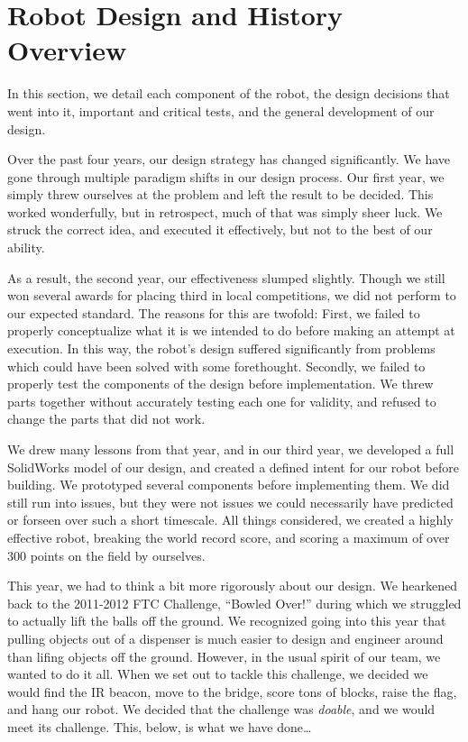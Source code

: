 \section{Robot Design and History Overview}
In this section, we detail each component of the robot, the design decisions that went into it, important and critical tests, and the general development of our design.

Over the past four years, our design strategy has changed significantly. We have gone through multiple paradigm shifts in our design process. Our first year, we simply threw ourselves at the problem and left the result to be decided. This worked wonderfully, but in retrospect, much of that was simply sheer luck. We struck the correct idea, and executed it effectively, but not to the best of our ability. 
	
As a result, the second year, our effectiveness slumped slightly. Though we still won several awards for placing third in local competitions, we did not perform to our expected standard. The reasons for this are twofold: First, we failed to properly conceptualize what it is we intended to do before making an attempt at execution. In this way, the robot's design suffered significantly from problems which could have been solved with some forethought. Secondly, we failed to properly test the components of the design before implementation. We threw parts together without accurately testing each one for validity, and refused to change the parts that did not work.

We drew many lessons from that year, and in our third year, we developed a full SolidWorks model of our design, and created a defined intent for our robot before building. We prototyped several components before implementing them. We did still run into issues, but they were not issues we could necessarily have predicted or forseen over such a short timescale. All things considered, we created a highly effective robot, breaking the world record score, and scoring a maximum of over 300 points on the field by ourselves.

This year, we had to think a bit more rigorously about our design. We hearkened back to the 2011-2012 FTC Challenge, ``Bowled Over!'' during which we struggled to actually lift the balls off the ground. We recognized going into this year that pulling objects out of a dispenser is much easier to design and engineer around than lifing objects off the ground. However, in the usual spirit of our team, we wanted to do it all. When we set out to tackle this challenge, we decided we would find the IR beacon, move to the bridge, score tons of blocks, raise the flag, and hang our robot. We decided that the challenge was \textit{doable}, and we would meet its challenge. This, below, is what we have done\ldots


